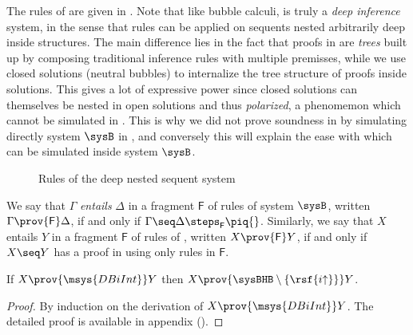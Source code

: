 The rules of  are given in . Note that like
bubble calculi,  is truly a \emph{deep inference} system, in the
sense that rules can be applied on sequents nested arbitrarily deep inside
structures. The main difference lies in the fact that
proofs in  are \emph{trees} built up by composing traditional
inference rules with multiple premisses, while we use closed solutions (neutral
bubbles) to internalize the tree structure of proofs inside solutions. This
gives a lot of expressive power since closed solutions can themselves be nested
in open solutions and thus \emph{polarized}, a phenomemon which cannot be
simulated in . This is why we did not prove soundness in
 by simulating directly system $\sysB$ in
, and conversely this will explain the ease with which 
can be simulated inside system $\sysB$.

\begin{figure*}
  
  \caption{Rules of the deep nested sequent system }
\end{figure*}

\begin{definition}
  We say that $\Gamma$ \emph{entails} $\Delta$ in a fragment $\mathsf{F}$ of
  rules of system $\sysB$, written $\Gamma \prov{\mathsf{F}} \Delta$, if and
  only if $\Gamma \seq \Delta \steps_{\mathsf{F}} \piq{}$. Similarly, we say
  that $X$ entails $Y$ in a fragment $\mathsf{F}$ of rules of ,
  written $X \prov{\mathsf{F}} Y$, if and only if $X \seq Y$ has a proof in
   using only rules in $\mathsf{F}$.
\end{definition}

\begin{lemma}
  
  If $X \prov{\msys{DBiInt}} Y$ then $X \prov{\sysBHB \setminus
  \{\rsf{i{\uparrow}}\}} Y$.
\end{lemma}
\begin{proof}
  By induction on the derivation of $X \prov{\msys{DBiInt}} Y$. The detailed
  proof is available in appendix (). 
\end{proof}

